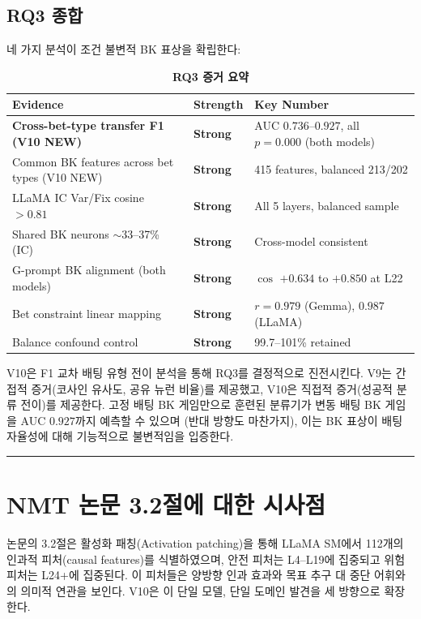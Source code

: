 \documentclass[11pt,a4paper]{article}
\begin{document}
\subsection{RQ3 종합}

네 가지 분석이 조건 불변적 BK 표상을 확립한다:

\begin{table}[H]
\centering
\caption*{\textbf{RQ3 증거 요약}}
\footnotesize
\begin{tabular}{llp{7cm}}
\toprule
Evidence & Strength & Key Number \\
\midrule
\textbf{Cross-bet-type transfer F1 (V10 NEW)} & \textbf{Strong} & AUC $0.736$--$0.927$, all $p=0.000$ (both models) \\
Common BK features across bet types (V10 NEW) & \textbf{Strong} & 415 features, balanced 213/202 \\
LLaMA IC Var/Fix cosine $> 0.81$ & \textbf{Strong} & All 5 layers, balanced sample \\
Shared BK neurons $\sim$33--37\% (IC) & \textbf{Strong} & Cross-model consistent \\
G-prompt BK alignment (both models) & \textbf{Strong} & $\cos$ $+0.634$ to $+0.850$ at L22 \\
Bet constraint linear mapping & \textbf{Strong} & $r = 0.979$ (Gemma), $0.987$ (LLaMA) \\
Balance confound control & \textbf{Strong} & 99.7--101\% retained \\
\bottomrule
\end{tabular}
\end{table}

\noindent V10은 F1 교차 배팅 유형 전이 분석을 통해 RQ3를 결정적으로 진전시킨다. V9는 간접적 증거(코사인 유사도, 공유 뉴런 비율)를 제공했고, V10은 직접적 증거(성공적 분류 전이)를 제공한다. 고정 배팅 BK 게임만으로 훈련된 분류기가 변동 배팅 BK 게임을 AUC $0.927$까지 예측할 수 있으며 (반대 방향도 마찬가지), 이는 BK 표상이 배팅 자율성에 대해 기능적으로 불변적임을 입증한다.

\bigskip\hrule\bigskip

\section{NMT 논문 3.2절에 대한 시사점}

논문의 3.2절은 활성화 패칭(Activation patching)을 통해 LLaMA SM에서 112개의 인과적 피처(causal features)를 식별하였으며, 안전 피처는 L4--L19에 집중되고 위험 피처는 L24+에 집중된다. 이 피처들은 양방향 인과 효과와 목표 추구 대 중단 어휘와의 의미적 연관을 보인다. V10은 이 단일 모델, 단일 도메인 발견을 세 방향으로 확장한다.
\end{document}
